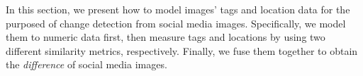 \documentclass[runningheads,a4paper]{llncs}
\begin{document}
In this section, we present how to model images' tags and location data for the purposed of change detection from social media images. 
Specifically, we model them to numeric data first, then measure tags and locations by using two different similarity metrics, respectively. Finally, we fuse them together to obtain the \emph{difference} of social media images. 

\end{document}
